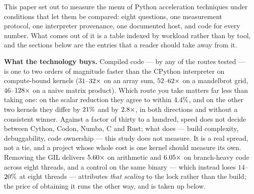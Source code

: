 This paper set out to measure the menu of Python acceleration techniques under conditions that
let them be compared: eight questions, one measurement protocol, one interpreter provenance,
one documented host, and code for every number. What comes out of it is a table indexed
by workload rather than by tool, and the sections below are the entries that a reader should
take away from it.

\textbf{What the technology buys.} Compiled code --- by any of the routes tested --- is one
to two orders of magnitude faster than the CPython interpreter on compute-bound kernels
($31$--$\meas{ratio:b1_compute-314:arraysum/cpython_loop|b1_compute-314:arraysum/codon_pyext_ptr}{32}\times$ on an array sum, $52$--$\meas{ratio:b1_compute-314:mandelbrot/cpython_loop|b1_compute-314:mandelbrot/cython}{62}\times$ on a mandelbrot grid, $46$--$\meas{ratio:b1_compute-314:matmul/cpython_loop|b1_compute-314:matmul/numba}{128}\times$ on a
naive matrix product). Which route you take matters far less than taking one: on the
scalar reduction they agree to within $\meas{pct:b1_compute-314:arraysum/codon_jit|b1_compute-314:arraysum/codon_pyext_ptr}{4.4}\%$, and on the other two kernels they differ by
$\meas{pct:b1_compute-314:mandelbrot/codon_jit|b1_compute-314:mandelbrot/cython}{21}\%$ and by $\meas{ratio:b1_compute-314:matmul/codon_jit|b1_compute-314:matmul/numba}{2.8}\times$, in
both directions and without a consistent winner. Against a factor of thirty to a hundred, speed
does not decide between Cython, Codon, Numba, C and Rust; what does --- build complexity,
debuggability, code ownership --- this study does not measure. It is a real spread, not
a tie, and a project whose whole cost is one kernel should measure its own. Removing the GIL delivers
$\meas{ratio:b4_threads-ft:py_arith/ft/T1_control|b4_threads-ft:py_arith/ft/T8}{5.60}\times$ on arithmetic and $\meas{ratio:b4_threads-ft:py_branchy/ft/T1|b4_threads-ft:py_branchy/ft/T8}{6.05}\times$ on branch-heavy code across eight threads,
and a  control on the same binary --- which instead loses $14$--$\meas{saving:b4_threads-ft_gil:py_arith/ft_gil/T1_control|b4_threads-ft_gil:py_arith/ft_gil/T8}{20}\%$ at
eight threads --- attributes \emph{that scaling} to the lock rather than the build; the price of
obtaining it runs the other way, and is taken up below.


